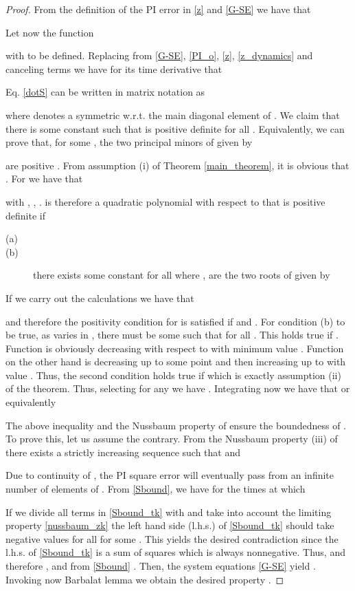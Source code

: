 \documentclass[preprint,12pt]{article}
\begin{document}
\begin{proof}
From the definition of the PI error  in \eqref{z} and \eqref{G-SE} we have that

Let now the function

with  to be defined. Replacing from \eqref{G-SE}, \eqref{PI_o}, \eqref{z}, \eqref{z_dynamics} and canceling terms we have for its time derivative that

Eq. \eqref{dotS} can be written in matrix notation as

where   denotes a symmetric w.r.t. the main diagonal element of . We claim that there is some constant  such that  is positive definite for all . Equivalently, we can prove that, for some , the two principal minors of  given by

are positive . From assumption (i)  of Theorem \ref{main_theorem}, it is obvious that  . For  we have that

with , , .  is therefore a quadratic polynomial with respect to  that is positive definite  if
\begin{description}
  \item[(a)] 
  \item[(b)] there exists some constant  for all  where ,  are the two roots of  given by

\end{description}
If we carry out the calculations we have that

and therefore the positivity  condition for  is satisfied if  and . For condition (b) to be true, as  varies in , there must be some  such that  for all . This holds true if . Function  is obviously decreasing with respect to  with minimum value . Function  on the other hand is decreasing up to some point  and then increasing up to  with value . Thus, the second condition holds true if  which is exactly assumption (ii) of the theorem. Thus, selecting   for any   we have .
Integrating now  we have that  or equivalently

The above inequality and the Nussbaum property of  ensure the boundedness of . To prove this, let us assume the contrary. From the Nussbaum property (iii) of  there exists a strictly increasing sequence  such that  and

Due to continuity of , the PI square error  will eventually pass from an infinite number of elements of . From \eqref{Sbound}, we have for the times  at which 

If we divide all terms in \eqref{Sbound_tk} with  and take into account  the limiting property \eqref{nussbaum_zk} the left hand side (l.h.s.) of \eqref{Sbound_tk} should take negative values for all  for some . This yields the desired contradiction since the l.h.s. of \eqref{Sbound_tk} is a sum of squares which is always nonnegative. Thus,  and therefore ,  and from \eqref{Sbound} . Then, the system equations \eqref{G-SE} yield . Invoking now Barbalat lemma we obtain the desired property .
\end{proof}
\end{document}
